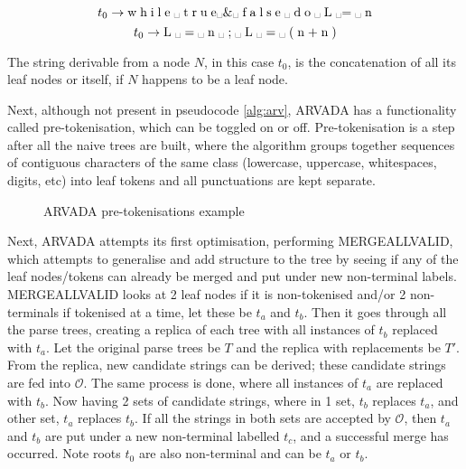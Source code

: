 \[
t_0 \to \text{w\;h\;i\;l\;e\;\textvisiblespace\;t\;r\;u\;e\textvisiblespace\&\textvisiblespace\;f\;a\;l\;s\;e\;\textvisiblespace\;d\;o\;\textvisiblespace\;L\;\textvisiblespace=\;\textvisiblespace\;n}
\]
\[
t_0 \to \text{L\;\textvisiblespace\;=\;\textvisiblespace \;n\;\textvisiblespace\;;\;\textvisiblespace\;L\;\textvisiblespace\;=\;\textvisiblespace\;(\;n\;+\;n\;)}
\]

The string derivable from a node $N$, in this case $t_0$, is the concatenation of all its leaf nodes or itself, if $N$ happens to be a leaf node. 

\vspace{\baselineskip}
Next, although not present in pseudocode \ref{alg:arv}, ARVADA has a functionality called pre-tokenisation, which can be toggled on or off. Pre-tokenisation is a step after all the naive trees are built, where the algorithm groups together sequences of contiguous characters of the same class (lowercase, uppercase, whitespaces, digits, etc) into leaf tokens and all punctuations are kept separate.

\begin{figure}[h!]
\centering
{}

\caption{ARVADA pre-tokenisations example}
\label{fig:tokenisedNaiveTrees}
\end{figure}

Next, ARVADA attempts its first optimisation, performing MERGEALLVALID, which attempts to generalise and add structure to the tree by seeing if any of the leaf nodes/tokens can already be merged and put under new non-terminal labels. MERGEALLVALID looks at 2 leaf nodes if it is non-tokenised and/or 2 non-terminals if tokenised at a time, let these be $t_a$ and $t_b$. Then it goes through all the parse trees, creating a replica of each tree with all instances of $t_b$ replaced with $t_a$. Let the original parse trees be $T$ and the replica with replacements be $T'$. From the replica, new candidate strings can be derived; these candidate strings are fed into $\mathcal{O}$. The same process is done, where all instances of $t_a$ are replaced with $t_b$. Now having 2 sets of candidate strings, where in 1 set, $t_b$ replaces $t_a$, and other set, $t_a$ replaces $t_b$. If all the strings in both sets are accepted by $\mathcal{O}$, then $t_a$ and $t_b$ are put under a new non-terminal labelled $t_c$, and a successful merge has occurred. Note roots $t_0$ are also non-terminal and can be $t_a$ or $t_b$.



